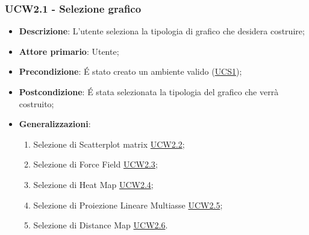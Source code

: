 \subsubsection{UCW2.1 - Selezione grafico}
\label{ssub:ucW2.1}
\begin{itemize}

	\item \textbf{Descrizione}: L’utente seleziona la tipologia di grafico che desidera costruire;

    \item \textbf{Attore primario}: Utente;

	\item \textbf{Precondizione}:   É stato creato un ambiente valido (\hyperref[sub:ucs1]{UCS1});
	
    \item \textbf{Postcondizione}:  É stata selezionata la tipologia del grafico che verrà costruito;

	\item \textbf{Generalizzazioni}:
		\begin{enumerate}
			
			\item Selezione di Scatterplot matrix \hyperref[ssub:ucw2.2]{UCW2.2};
			\item Selezione di Force Field \hyperref[ssub:ucw2.3]{UCW2.3};
			\item Selezione di Heat Map \hyperref[ssub:ucw2.4]{UCW2.4};
			\item Selezione di Proiezione Lineare Multiasse \hyperref[ssub:ucw2.5]{UCW2.5};
			\item Selezione di Distance Map \hyperref[ssub:ucw2.6]{UCW2.6}.
			
		\end{enumerate}

\end{itemize}


